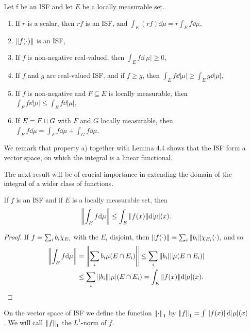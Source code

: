 \begin{lemma}
Let f be an ISF and let $E$ be a locally measurable set.
\begin{enumerate}
    \item If $r$ is a scalar, then $rf$ is an ISF, and $\int_E(rf)\dd\mu=r\int_Ef\dd\mu$,
    
    \item $\norm{f(\cdot)}$ is an ISF,
    
    \item If $f$ is non-negative real-valued, then $\int_Ef\dd|\mu|\geq0$,
    
    \item If $f$ and $g$ are real-valued ISF, and if $f \geq g$, then $\int_Ef\dd|\mu|\geq\int_Eg\dd|\mu|$,
    
    \item If $f$ is non-negative and $F \subseteq E$ is locally measurable, then $\int_Ff\dd|\mu|\leq\int_Ef\dd|\mu|$,

    \item If $E=F\sqcup G$ with $F$ and $G$ locally measurable, then $\int_Ef\dd\mu=\int_Ff\dd\mu+\int_Gf\dd\mu$.
\end{enumerate}
\end{lemma} 

We remark that property a) together with Lemma 4.4 shows that the ISF form a vector space, on which the integral is a linear functional.

The next result will be of crucial importance in extending the domain of the integral of a wider class of functions.

\begin{lemma}
If $f$ is an ISF and if $E$ is a locally measurable set, then $$\norm{\int_Ef\dd\mu}\leq\int_E\norm{f(x)}\dd|\mu|(x).$$
\end{lemma}

\begin{proof}
If $f=\sum_ib_i\chi_{E_i}$ with the $E_i$ disjoint, then $\norm{f(\cdot)}=\sum_i\norm{b_i}\chi_{E_i}(\cdot)$, and so
\begin{align*}
    \norm{\int_Ef\dd\mu}&=\norm{\sum_ib_i\mu(E\cap E_i)}\leq\sum_i\norm{b_i}|\mu(E\cap E_i)|\\
    &\leq\sum_i\norm{b_i}|\mu|(E\cap E_i)=\int_E\norm{f(x)}\dd|\mu|(x).
\end{align*}
\end{proof}

\begin{definition}
On the vector space of ISF we define the function $\norm{\cdot}_1$ by $\norm{f}_1=\int\norm{f(x)}\dd|\mu|(x)$. We will call $\norm{f}_1$ the $L^1$-norm of $f$.
\end{definition}

